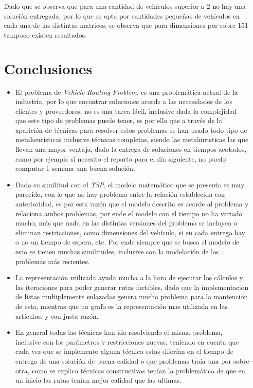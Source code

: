 \documentclass[letter, 10pt]{article}
\begin{document}
Dado que se observa que para una cantidad de veh\'iculos superior a 2 no hay una soluci\'on entregada, por lo que se opta por cantidades peque\~nas de veh\'iculos en cada una de las distintas matrices, se observa que para dimensiones por sobre 151 tampoco existen resultados.
\newpage
\section{Conclusiones}
\begin{itemize}
 \item El problema de \emph{Vehicle Routing Problem}, es una problem\'atica actual de la industria, por lo que encontrar soluciones acorde a las necesidades de los clientes y proveedores, no es una tarea f\'acil, inclusive dada la complejidad que este tipo de problemas puede tener, es por ello que a trav\'es de la aparici\'on de t\'ecnicas para resolver estos problemas se han usado todo tipo de metaheur\'isticas inclusive t\'ecnicas completas, siendo las metahuristicas las que llevan una mayor ventaja, dado la entrega de soluciones en tiempos acotados, como por ejemplo si necesito el reparto para el d\'ia siguiente, no puedo computar 1 semana una buena soluci\'on.
 \item Dada su similitud con el \emph{TSP}, el modelo matem\'atico que se presenta es muy parecido, con lo que no hay problema entre la relaci\'on establecida con anterioridad, es por esta raz\'on que el modelo descrito es acorde al problema y relaciona ambos problemas, por ende el modelo con el tiempo no ha variado mucho, m\'as que nada en las distintas versiones del problema se incluyen o eliminan restricciones, como dimensiones del veh\'iculo, si en cada entrega hay o no un tiempo de espera, etc. Por ende siempre que se busca el modelo de esto se tienen muchas similitudes, inclusive con la modelaci\'on de los problemas m\'as recientes.
 
 \item La representaci\'on utilizada ayuda mucha a la hora de ejecutar los c\'alculos y las iteraciones para poder generar rutas factibles, dado que la implementacion de listas multiplemente enlazadas genera mucho problema para la mantencion de esta, mientras que un grafo es la representaci\'on mas utilizada en las art\'iculos, y con justa raz\'on.
 
 \item En general todas las t\'ecnicas han ido resolviendo el mismo problema, inclusive con los par\'ametros y restricciones nuevas, teniendo en cuenta que cada vez que se implemento alguna t\'ecnica estas difer\'ian en el tiempo de entrega de una soluci\'on de buena calidad o que problemas tra\'ia una por sobre otra, como se explico t\'ecnicas constructivas ten\'ian la problem\'atica de que en un inicio las rutas ten\'ian mejor calidad que las ultimas.
 

\end{itemize}
\end{document}
